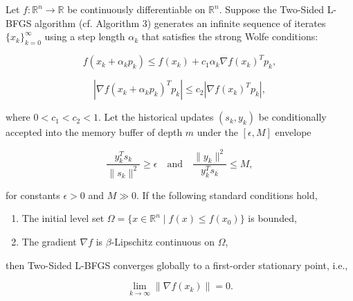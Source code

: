 \documentclass[twoside,11pt]{article}
\begin{document}
\begin{theorem}
Let $f: \mathbb{R}^n \to \mathbb{R}$ be continuously differentiable on $\mathbb{R}^n$. Suppose the Two-Sided L-BFGS algorithm (cf. Algorithm 3) generates an infinite sequence of iterates $\{x_k\}_{k=0}^{\infty}$ using a step length $\alpha_k$ that satisfies the strong Wolfe conditions:

\[
f(x_k + \alpha_k p_k) \leq f(x_k) + c_1 \alpha_k \nabla f(x_k)^T p_k,
\]

\[
|\nabla f(x_k + \alpha_k p_k)^T p_k| \leq c_2 |\nabla f(x_k)^T p_k|,
\]

\noindent
where $0 < c_1 < c_2 < 1$. Let the historical updates $(s_k, y_k)$ be conditionally accepted into the memory buffer of depth $m$ under the $[\epsilon, M]$ envelope

\[
\frac{y_k^T s_k}{\|s_k\|^2} \geq \epsilon \quad \text{and} \quad \frac{\|y_k\|^2}{y_k^T s_k} \leq M,
\]

\noindent
for constants $\epsilon > 0$ and $M \gg 0$. If the following standard conditions hold,
\begin{enumerate}
\item The initial level set $\Omega = \{x \in \mathbb{R}^n \mid f(x) \leq f(x_0)\}$ is bounded,
\item The gradient $\nabla f$ is $\beta$-Lipschitz continuous on $\Omega$,
\end{enumerate}

\noindent
then Two-Sided L-BFGS converges globally to a first-order stationary point, i.e., 

\[
\lim_{k \to \infty} \|\nabla f(x_k)\| = 0.
\]
\end{theorem}
\end{document}
